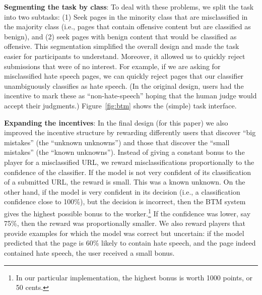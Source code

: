 \textbf{Segmenting the task by class}: To deal with these problems, we split the task into two subtasks: (1) Seek pages in the minority class that are misclassified in the majority class (i.e., pages that contain offensive content but are classified as benign), and (2) seek pages with benign content that would be classified as offensive. This segmentation simplified the overall design and made the task easier for participants to understand.  Moreover, it allowed us to quickly reject submissions that were of no interest.  For example, if we are asking for misclassified hate speech pages, we can quickly reject pages that our classifier unambiguously classifies as hate speech. (In the original design, users had the incentive to mark these as ``non-hate-speech'' hoping that the human judge would accept their judgments.) Figure~\ref{fig:btm} shows the (simple) task interface.

\textbf{Expanding the incentives}: In the final design (for this paper) we also improved the incentive structure by rewarding differently users that discover ``big mistakes'' (the ``unknown unknowns'') and those that discover the ``small mistakes'' (the ``known unknowns''). Instead of giving a constant bonus to the player for a misclassified URL, we reward misclassifications proportionally to the confidence of the classifier. 
If the model is not very confident of its classification of a submitted URL,
the reward is small.  This was a known unknown.
On the other hand, if the model is very confident in its decision (i.e., a classification confidence close to 100\%), but the decision is incorrect, then the BTM system gives the highest possible bonus to the worker.\footnote{In our particular implementation, the highest bonus is worth 1000 points, or 50 cents.} If the confidence was lower, say 75\%, then the reward was proportionally smaller. We also reward players that provide examples for which the model was correct but uncertain: if the model predicted that the page is 60\% likely to contain hate speech, and the page indeed contained hate speech, the user received a small bonus.



